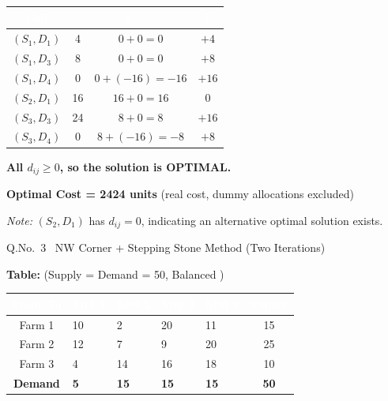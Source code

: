 \documentclass[12pt]{article}
\begin{document}
\begin{ansbox}
\begin{center}
\begin{tabular}{|c|c|c|c|}
\hline
\rowcolor{primary!80}\textcolor{white}{\textbf{Cell}} & \textcolor{white}{\textbf{$c_{ij}$}} & \textcolor{white}{\textbf{$u_i+v_j$}} & \textcolor{white}{\textbf{$d_{ij}$}}\\
\hline
$(S_1,D_1)$ & 4 & $0+0=0$ & $+4$\\\hline
$(S_1,D_3)$ & 8 & $0+0=0$ & $+8$\\\hline
$(S_1,D_4)$ & 0 & $0+(-16)=-16$ & $+16$\\\hline
$(S_2,D_1)$ & 16 & $16+0=16$ & $0$\\\hline
$(S_3,D_3)$ & 24 & $8+0=8$ & $+16$\\\hline
$(S_3,D_4)$ & 0 & $8+(-16)=-8$ & $+8$\\\hline
\end{tabular}
\end{center}

\textbf{All $d_{ij}\geq0$, so the solution is OPTIMAL.}

\begin{center}
\textbf{Optimal Cost = 2424 units} \quad(real cost, dummy allocations excluded)
\end{center}
\textit{Note:} $(S_2,D_1)$ has $d_{ij}=0$, indicating an alternative optimal solution exists.
\end{ansbox}

\newpage

\begin{qbox}{Q.No.\ 3 \textemdash\ NW Corner + Stepping Stone Method (Two Iterations)}
\end{qbox}

\medskip
\textbf{Table:} (Supply = Demand = 50, Balanced \checkmark)

\begin{center}
\begin{tabular}{|c|C{1.5cm}|C{1.5cm}|C{1.5cm}|C{1.5cm}|c|}
\hline
{}
\textcolor{white}{\textbf{From$\backslash$To}} & \textcolor{white}{\textbf{Mill 1}} & \textcolor{white}{\textbf{Mill 2}} & \textcolor{white}{\textbf{Mill 3}} & \textcolor{white}{\textbf{Mill 4}} & \textcolor{white}{\textbf{Supply}}\\
\hline
Farm 1 & 10 & 2 & 20 & 11 & 15\\\hline
Farm 2 & 12 & 7 & 9 & 20 & 25\\\hline
Farm 3 & 4 & 14 & 16 & 18 & 10\\\hline
\textbf{Demand} & \textbf{5} & \textbf{15} & \textbf{15} & \textbf{15} & \textbf{50}\\\hline
\end{tabular}
\end{center}
\end{document}

